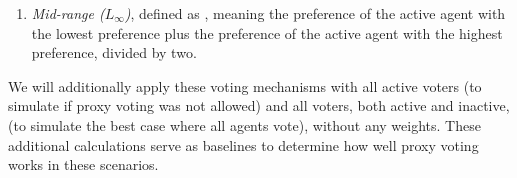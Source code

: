\begin{enumerate}
{        %
        This is a typical weighted average.
    }
    \item {
        \textit{Mid-range ($L_\infty$)}, defined as
        $$, meaning the preference
        of the active agent with the lowest preference plus the preference of the
        active agent with the highest preference, divided by two.
    }
\end{enumerate}
We will additionally  apply these voting mechanisms with all active voters (to simulate
if proxy voting was not allowed) and all voters, both active and inactive, (to simulate
the best case where all agents vote), without any weights.
These additional calculations serve as baselines to determine how well proxy voting
works in these scenarios.

